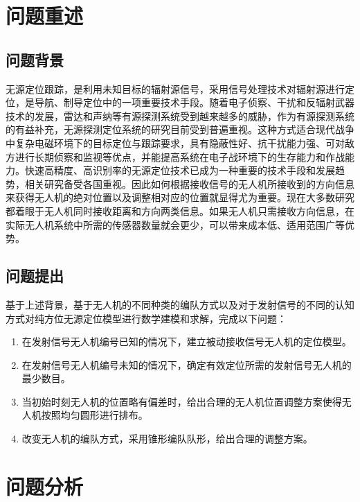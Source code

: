 \documentclass[withoutpreface,bwprint]{cumcmthesis} %
\begin{document}


\section{问题重述}
\subsection{问题背景}
无源定位跟踪，是利用未知目标的辐射源信号，采用信号处理技术对辐射源进行定位，是导航、制导定位中的一项重要技术手段。随着电子侦察、干扰和反辐射武器技术的发展，雷达和声纳等有源探测系统受到越来越多的威胁，作为有源探测系统的有益补充，无源探测定位系统的研究目前受到普遍重视。这种方式适合现代战争中复杂电磁环境下的目标定位与跟踪要求，具有隐蔽性好、抗干扰能力强、可对敌方进行长期侦察和监视等优点，并能提高系统在电子战环境下的生存能力和作战能力。快速高精度、高识别率的无源定位技术已成为一种重要的技术手段和发展趋势，相关研究备受各国重视\cite{RN1}。因此如何根据接收信号的无人机所接收到的方向信息来获得无人机的绝对位置以及调整相对应的位置就显得尤为重要。现在大多数研究都着眼于无人机同时接收距离和方向两类信息\cite{lee2020cooperative}。如果无人机只需接收方向信息，在实际无人机系统中所需的传感器数量就会更少，可以带来成本低、适用范围广等优势。

\subsection{问题提出}

基于上述背景，基于无人机的不同种类的编队方式以及对于发射信号的不同的认知方式对纯方位无源定位模型进行数学建模和求解，完成以下问题：

\begin{enumerate}[{1)}]
    \item 在发射信号无人机编号已知的情况下，建立被动接收信号无人机的定位模型。
    \item 在发射信号无人机编号未知的情况下，确定有效定位所需的发射信号无人机的最少数目。
    \item 当初始时刻无人机的位置略有偏差时，给出合理的无人机位置调整方案使得无人机按照均匀圆形进行排布。
    \item 改变无人机的编队方式，采用锥形编队队形，给出合理的调整方案。
\end{enumerate}

\section{问题分析}
\end{document}
